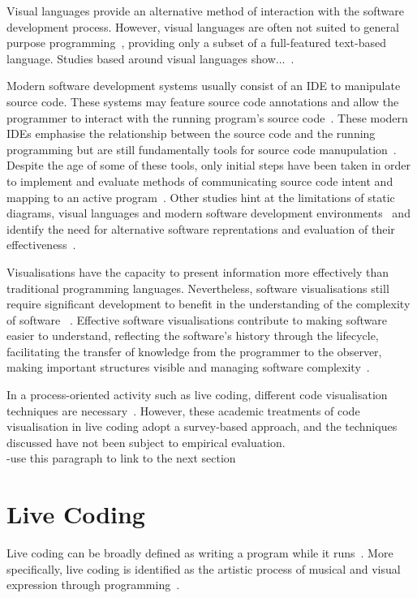Visual languages provide an alternative method of interaction with the software development process. However, visual languages are often not suited to general purpose programming~\cite{Myers1989}, providing only a subset of a full-featured text-based language. Studies based around visual languages show...~.

Modern software development systems usually consist of an \ac{IDE} to manipulate source code. These systems may feature source code annotations and allow the programmer to interact with the running program's source code~. These modern \acp{IDE} emphasise the relationship between the source code and the running programming but are still fundamentally tools for source code manupulation~. Despite the age of some of these tools, only initial steps have been taken in order to implement and evaluate methods of communicating source code intent and mapping to an active program~. Other studies hint at the limitations of static diagrams, visual languages and modern software development environments~ and identify the need for alternative software reprentations and evaluation of their effectiveness~. 

Visualisations have the capacity to present information more effectively than traditional programming languages. Nevertheless, software visualisations still require significant development to benefit in the understanding of the complexity of software ~\cite{Baecker1995}. Effective software visualisations contribute to making software easier to understand, reflecting the software's history through the lifecycle, facilitating the transfer of knowledge from the programmer to the observer, making important structures visible and managing software complexity~\cite{Baecker1995}.

In a process-oriented activity such as live coding, different code visualisation techniques are necessary~\cite{McLean2010a,Magnusson2013}. However, these academic treatments of code visualisation in live coding adopt a survey-based approach, and the techniques discussed have not been subject to empirical evaluation.\\
-use this paragraph to link to the next section

\section{Live Coding}

Live coding can be broadly defined as writing a program while it runs~\cite{Ward2004}. More specifically, live coding is identified as the artistic process of musical and visual expression through programming~\cite{Collins2003}.

